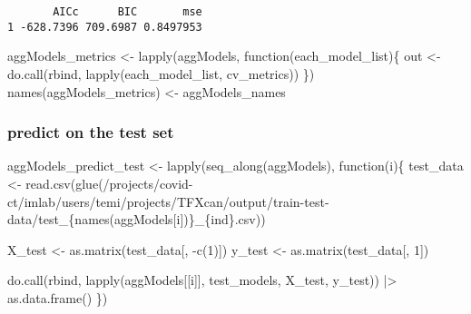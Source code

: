 \documentclass[
  letterpaper,
  DIV=11,
  numbers=noendperiod]{scrartcl}
\newenvironment{Shaded}{\begin{snugshade}}{\end{snugshade}}
\newcommand{\ControlFlowTok}[1]{\textcolor[rgb]{0.00,0.23,0.31}{#1}}
\newcommand{\DecValTok}[1]{\textcolor[rgb]{0.68,0.00,0.00}{#1}}
\newcommand{\FunctionTok}[1]{\textcolor[rgb]{0.28,0.35,0.67}{#1}}
\newcommand{\NormalTok}[1]{\textcolor[rgb]{0.00,0.23,0.31}{#1}}
\newcommand{\OtherTok}[1]{\textcolor[rgb]{0.00,0.23,0.31}{#1}}
\newcommand{\SpecialCharTok}[1]{\textcolor[rgb]{0.37,0.37,0.37}{#1}}
\newcommand{\StringTok}[1]{\textcolor[rgb]{0.13,0.47,0.30}{#1}}
\begin{document}
\begin{verbatim}
       AICc      BIC       mse
1 -628.7396 709.6987 0.8497953
\end{verbatim}

\begin{Shaded}
\begin{Highlighting}[numbers=left,,]
\NormalTok{aggModels\_metrics }\OtherTok{\textless{}{-}} \FunctionTok{lapply}\NormalTok{(aggModels, }\ControlFlowTok{function}\NormalTok{(each\_model\_list)\{}
\NormalTok{    out }\OtherTok{\textless{}{-}} \FunctionTok{do.call}\NormalTok{(rbind, }\FunctionTok{lapply}\NormalTok{(each\_model\_list, cv\_metrics))}
\NormalTok{\})}
\FunctionTok{names}\NormalTok{(aggModels\_metrics) }\OtherTok{\textless{}{-}}\NormalTok{ aggModels\_names}
\end{Highlighting}
\end{Shaded}

\hypertarget{predict-on-the-test-set}{%
\subsubsection{predict on the test set}\label{predict-on-the-test-set}}

\begin{Shaded}
\begin{Highlighting}[numbers=left,,]
\NormalTok{aggModels\_predict\_test }\OtherTok{\textless{}{-}} \FunctionTok{lapply}\NormalTok{(}\FunctionTok{seq\_along}\NormalTok{(aggModels), }\ControlFlowTok{function}\NormalTok{(i)\{}
\NormalTok{    test\_data }\OtherTok{\textless{}{-}} \FunctionTok{read.csv}\NormalTok{(}\FunctionTok{glue}\NormalTok{(}\StringTok{\textquotesingle{}/projects/covid{-}ct/imlab/users/temi/projects/TFXcan/output/train{-}test{-}data/test\_\{names(aggModels[i])\}\_\{ind\}.csv\textquotesingle{}}\NormalTok{))}

\NormalTok{    X\_test }\OtherTok{\textless{}{-}} \FunctionTok{as.matrix}\NormalTok{(test\_data[, }\SpecialCharTok{{-}}\FunctionTok{c}\NormalTok{(}\DecValTok{1}\NormalTok{)])}
\NormalTok{    y\_test }\OtherTok{\textless{}{-}} \FunctionTok{as.matrix}\NormalTok{(test\_data[, }\DecValTok{1}\NormalTok{])}

    \FunctionTok{do.call}\NormalTok{(rbind, }\FunctionTok{lapply}\NormalTok{(aggModels[[i]], test\_models, X\_test, y\_test)) }\SpecialCharTok{|\textgreater{}} \FunctionTok{as.data.frame}\NormalTok{()}
\NormalTok{\})}
\end{Highlighting}
\end{Shaded}
\end{document}
